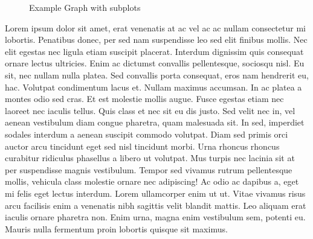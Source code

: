 \documentclass[
  12pt,
]{article}
\begin{document}
\begin{figure}[H]

{\centering {}

}

\caption{Example Graph with subplots}\label{fig:example-plot}
\end{figure}

Lorem ipsum dolor sit amet, erat venenatis at ac vel ac ac nullam consectetur mi lobortis. Penatibus donec, per sed nam suspendisse leo sed elit finibus mollis. Nec elit egestas nec ligula etiam suscipit placerat. Interdum dignissim quis consequat ornare lectus ultricies. Enim ac dictumst convallis pellentesque, sociosqu nisl. Eu sit, nec nullam nulla platea. Sed convallis porta consequat, eros nam hendrerit eu, hac. Volutpat condimentum lacus et. Nullam maximus accumsan. In ac platea a montes odio sed cras. Et est molestie mollis augue. Fusce egestas etiam nec laoreet nec iaculis tellus. Quis class et nec sit eu dis justo. Sed velit nec in, vel aenean vestibulum diam congue pharetra, quam malesuada sit. In sed, imperdiet sodales interdum a aenean suscipit commodo volutpat. Diam sed primis orci auctor arcu tincidunt eget sed nisl tincidunt morbi. Urna rhoncus rhoncus curabitur ridiculus phasellus a libero ut volutpat. Mus turpis nec lacinia sit at per suspendisse magnis vestibulum. Tempor sed vivamus rutrum pellentesque mollis, vehicula class molestie ornare nec adipiscing! Ac odio ac dapibus a, eget mi felis eget lectus interdum. Lorem ullamcorper enim ut ut. Vitae vivamus risus arcu facilisis enim a venenatis nibh sagittis velit blandit mattis. Leo aliquam erat iaculis ornare pharetra non. Enim urna, magna enim vestibulum sem, potenti eu. Mauris nulla fermentum proin lobortis quisque sit maximus.
\end{document}
